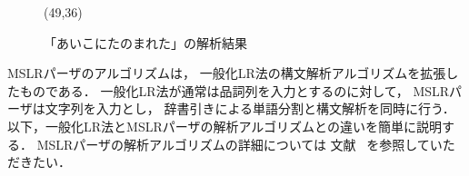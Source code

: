 \begin{figure}[htbp]
  \begin{center}
    \begin{epsf}
    \end{epsf}
    \begin{draft}
    \atari(49,36)
    \end{draft}
    \caption{「あいこにたのまれた」の解析結果}
    \label{fig:parse tree1}
  \end{center}
\end{figure}

MSLRパーザのアルゴリズムは，
一般化LR法の構文解析アルゴリズムを拡張したものである．
一般化LR法が通常は品詞列を入力とするのに対して，
MSLRパーザは文字列を入力とし，
辞書引きによる単語分割と構文解析を同時に行う．
以下，一般化LR法とMSLRパーザの解析アルゴリズムとの違いを簡単に説明する．
MSLRパーザの解析アルゴリズムの詳細については
文献~\cite{tanaka:95:a} を参照していただきたい．

